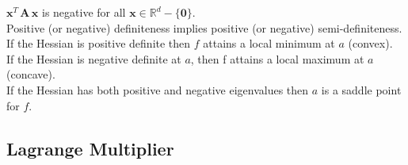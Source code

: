 $\mathbf{x}^ T \, \mathbf{A}\, \mathbf{x}$ is negative for all $\mathbf{x}\in \mathbb {R}^ d-\{ \mathbf{0}\}$.\\

Positive (or negative) definiteness implies positive (or negative) semi-definiteness.\\

If the Hessian is positive definite then $f$ attains a local minimum at $a$ (convex).\\

If the Hessian is negative definite at $a$, then f attains a local maximum at $a$ (concave).\\

If the Hessian has both positive and negative eigenvalues then $a$ is a saddle point for $f$.

\subsection*{Lagrange Multiplier}
